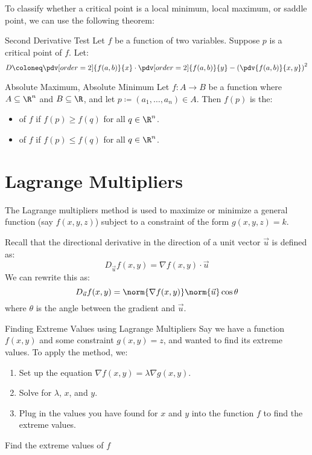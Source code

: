 To classify whether a critical point is a local minimum, local maximum, or saddle point, we can use the following theorem:

\begin{thmbox}{Second Derivative Test}{}
    Let $f$ be a function of two variables. Suppose $p$ is a critical point of $f$. Let:
    \[ D \coloneq \pdv[order=2]{f(a,b)}{x} \cdot \pdv[order=2]{f(a,b)}{y} - \left( \pdv{f(a,b)}{x,y} \right)^2 \]
\end{thmbox}

\begin{dfnbox}{Absolute Maximum, Absolute Minimum}{}
    Let $f : A \to B$ be a function where $A \subseteq \R^n$ and $B \subseteq \R$, and let $p \coloneq (a_1, \ldots, a_n) \in A$. Then $f(p)$ is the:
    \begin{itemize}[noitemsep]
        \item {} of $f$ if $f(p) \geq f(q)$ for all $q \in \R^n$.
        \item {} of $f$ if $f(p) \leq f(q)$ for all $q \in \R^n$.
    \end{itemize}
\end{dfnbox}

\section{Lagrange Multipliers}

The Lagrange multipliers method is used to maximize or minimize a general function (say $f(x,y,z)$) subject to a constraint of the form $g(x,y,z) = k$.


Recall that the directional derivative in the direction of a unit vector $\vec{u}$ is defined as:
\[ D_{\vec{u}} f(x,y) = \nabla f(x,y) \cdot \vec{u} \]
We can rewrite this as:
\[  D_{\vec{u}} f(x,y) = \norm{\nabla f(x,y)} \norm{\vec{u}} \cos \theta \]
where $\theta$ is the angle between the gradient and $\vec{u}$.

\begin{tecbox}{Finding Extreme Values using Lagrange Multipliers}{}
    Say we have a function $f(x,y)$ and some constraint $g(x,y) = z$, and wanted to find its extreme values. To apply the method, we:
    \begin{enumerate}
        \item Set up the equation $\nabla f(x,y) = \lambda \nabla g(x,y)$.
        \item Solve for $\lambda$, $x$, and $y$.
        \item Plug in the values you have found for $x$ and $y$ into the function $f$ to find the extreme values.
    \end{enumerate}
\end{tecbox}

\begin{exbox}{}{}
    Find the extreme values of $f$ 
\end{exbox}
